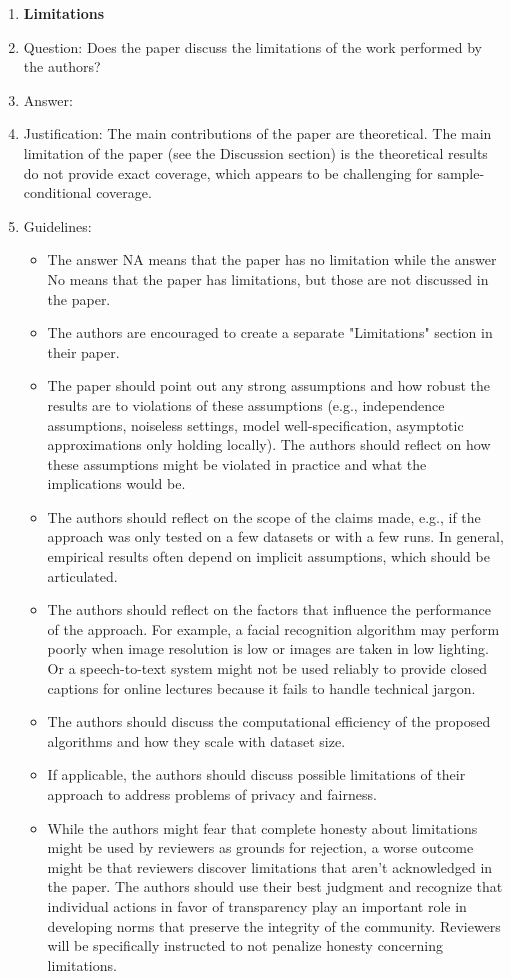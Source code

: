 \documentclass{article}
\begin{document}
\begin{enumerate}
\item {\bf Limitations}
    \item[] Question: Does the paper discuss the limitations of the work performed by the authors?
    \item[] Answer: \answerYes{} %
    \item[] Justification: The main contributions of the paper are
      theoretical. The main limitation of the paper (see the Discussion
      section) is the theoretical results do not provide exact coverage,
      which appears to be challenging for sample-conditional coverage.
    \item[] Guidelines:
    \begin{itemize}
        \item The answer NA means that the paper has no limitation while the answer No means that the paper has limitations, but those are not discussed in the paper. 
        \item The authors are encouraged to create a separate "Limitations" section in their paper.
        \item The paper should point out any strong assumptions and how robust the results are to violations of these assumptions (e.g., independence assumptions, noiseless settings, model well-specification, asymptotic approximations only holding locally). The authors should reflect on how these assumptions might be violated in practice and what the implications would be.
        \item The authors should reflect on the scope of the claims made, e.g., if the approach was only tested on a few datasets or with a few runs. In general, empirical results often depend on implicit assumptions, which should be articulated.
        \item The authors should reflect on the factors that influence the performance of the approach. For example, a facial recognition algorithm may perform poorly when image resolution is low or images are taken in low lighting. Or a speech-to-text system might not be used reliably to provide closed captions for online lectures because it fails to handle technical jargon.
        \item The authors should discuss the computational efficiency of the proposed algorithms and how they scale with dataset size.
        \item If applicable, the authors should discuss possible limitations of their approach to address problems of privacy and fairness.
        \item While the authors might fear that complete honesty about limitations might be used by reviewers as grounds for rejection, a worse outcome might be that reviewers discover limitations that aren't acknowledged in the paper. The authors should use their best judgment and recognize that individual actions in favor of transparency play an important role in developing norms that preserve the integrity of the community. Reviewers will be specifically instructed to not penalize honesty concerning limitations.
    \end{itemize}


\end{enumerate}
\end{document}
